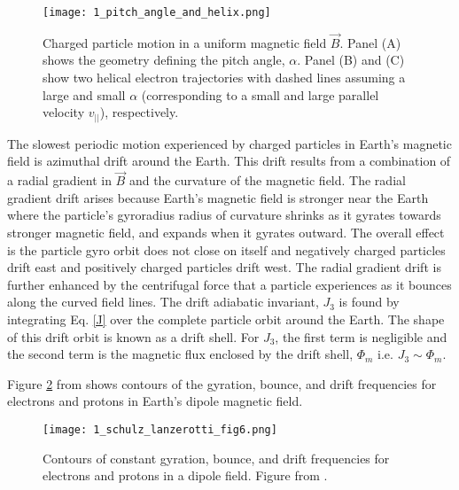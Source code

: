 \begin{figure}
\texttt{[image: 1\_pitch\_angle\_and\_helix.png]}
\caption{Charged particle motion in a uniform magnetic field $\vec{B}$. Panel (A) shows the geometry defining the pitch angle, $\alpha$. Panel (B) and (C) show two helical electron trajectories with dashed lines assuming a large and small $\alpha$ (corresponding to a small and large parallel velocity $v_{||}$), respectively.}
\label{Intro:pa}
\end{figure}

The slowest periodic motion experienced by charged particles in Earth's magnetic field is azimuthal drift around the Earth. This drift results from a combination of a radial gradient in $\vec{B}$ and the curvature of the magnetic field. The radial gradient drift arises because Earth's magnetic field is stronger near the Earth where the particle's gyroradius radius of curvature shrinks as it gyrates towards stronger magnetic field, and expands when it gyrates outward. The overall effect is the particle gyro orbit does not close on itself and negatively charged particles drift east and positively charged particles drift west. The radial gradient drift is further enhanced by the centrifugal force that a particle experiences as it bounces along the curved field lines. The drift adiabatic invariant, $J_3$ is found by integrating Eq. \ref{J} over the complete particle orbit around the Earth. The shape of this drift orbit is known as a drift shell. For $J_3$, the first term is negligible and the second term is the magnetic flux enclosed by the drift shell, $\Phi_m$  i.e. $J_3 \sim \Phi_m$. 

Figure \ref{Intro:adiabatic_frequencies} from \citet{Schulz1974} shows contours of the gyration, bounce, and drift frequencies for electrons and protons in Earth's dipole magnetic field. 

\begin{figure}
\texttt{[image: 1\_schulz\_lanzerotti\_fig6.png]}
\caption{Contours of constant gyration, bounce, and drift frequencies for electrons and protons in a dipole field. Figure from \citet{Schulz1974}.}
\label{Intro:adiabatic_frequencies}
\end{figure}

